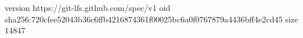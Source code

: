 version https://git-lfs.github.com/spec/v1
oid sha256:720cfee52043b36c6ffb4216874361f00025bc6a0f0767879a4436bff4e2cd45
size 14847
